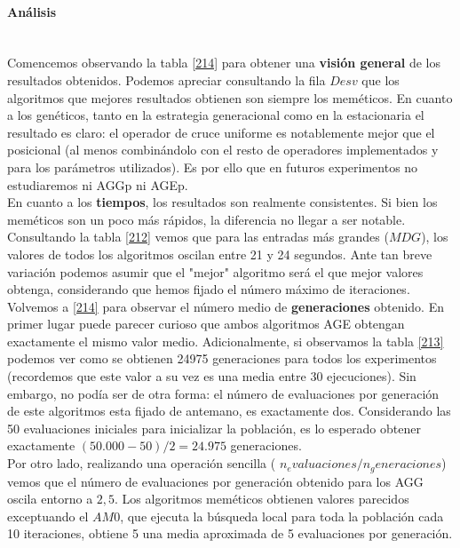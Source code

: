 \documentclass[11pt,a4paper]{article}
\begin{document}
	\paragraph{ Análisis} \ \\
	
	Comencemos observando la tabla \ref{214} para obtener una \textbf{visión general} de los resultados obtenidos. Podemos apreciar consultando la fila $Desv$ que los algoritmos que mejores resultados obtienen son siempre los meméticos. En cuanto a los genéticos, tanto en la estrategia generacional como en la estacionaria el resultado es claro: el operador de cruce uniforme es notablemente mejor que el posicional (al menos combinándolo con el resto de operadores implementados y para los parámetros utilizados). Es por ello que en futuros experimentos no  estudiaremos ni AGGp ni AGEp. \\
	
	En cuanto a los \textbf{tiempos}, los resultados son realmente consistentes. Si bien los meméticos son un poco más rápidos, la diferencia no llegar a ser notable. Consultando la tabla \ref{212} vemos que para las entradas más grandes ($MDG$), los valores de todos los algoritmos oscilan entre 21 y 24 segundos. Ante tan breve variación podemos asumir que el "mejor" algoritmo será el que mejor valores obtenga, considerando que hemos fijado el número máximo de iteraciones. \\
	
	Volvemos a \ref{214} para observar el número medio de \textbf{generaciones} obtenido. En primer lugar puede parecer curioso que ambos algoritmos AGE obtengan exactamente el mismo valor medio. Adicionalmente, si observamos la tabla \ref{213} podemos ver como se obtienen 24975 generaciones para todos los experimentos (recordemos que este valor a su vez es una media entre 30 ejecuciones). Sin embargo, no podía ser de otra forma: el número de evaluaciones por generación de este algoritmos esta fijado de antemano, es exactamente dos. Considerando las 50 evaluaciones iniciales para inicializar la población, es lo esperado obtener exactamente $(50.000 - 50) / 2 = 24.975$ generaciones. \\
	
	Por otro lado, realizando una operación sencilla ( $n_evaluaciones / n_generaciones$) vemos que el número de evaluaciones por generación obtenido para los AGG oscila entorno a $2,5$. Los algoritmos meméticos obtienen valores parecidos exceptuando el $AM0$, que ejecuta la búsqueda local para toda la población cada 10 iteraciones, obtiene 5 una media aproximada de 5 evaluaciones por generación. \\
	
\end{document}
